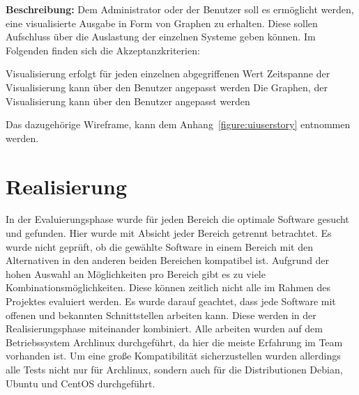 \textbf{Beschreibung:} Dem Administrator oder der Benutzer soll es ermöglicht
werden, eine visualisierte Ausgabe in Form von Graphen zu erhalten. Diese
sollen Aufschluss über die Auslastung der einzelnen Systeme geben können. Im
Folgenden finden sich die Akzeptanzkriterien:

\begin{outline}
  \1 Visualisierung erfolgt für jeden einzelnen abgegriffenen Wert
  \1 Zeitspanne der Visualisierung kann über den Benutzer angepasst werden
  \1 Die Graphen, der Visualisierung kann über den Benutzer angepasst werden
\end{outline}

Das dazugehörige Wireframe, kann dem Anhang~\ref{figure:uiuserstory}
entnommen werden.
\mr%

\chapter{Realisierung}
In der Evaluierungsphase wurde für jeden Bereich die optimale Software gesucht
und gefunden. Hier wurde mit Absicht jeder Bereich getrennt betrachtet. Es
wurde nicht geprüft, ob die gewählte Software in einem Bereich mit den
Alternativen in den anderen beiden Bereichen kompatibel ist. Aufgrund der hohen
Auswahl an Möglichkeiten pro Bereich gibt es zu viele
Kombinationsmöglichkeiten. Diese können zeitlich nicht alle im Rahmen des
Projektes evaluiert werden. Es wurde darauf geachtet, dass jede Software mit
offenen und bekannten Schnittstellen arbeiten kann. Diese werden in der
Realisierungsphase miteinander kombiniert. Alle arbeiten wurden auf dem
Betriebssystem Archlinux durchgeführt, da hier die meiste Erfahrung im Team
vorhanden ist. Um eine große Kompatibilität sicherzustellen wurden allerdings
alle Tests nicht nur für Archlinux, sondern auch für die Distributionen Debian,
Ubuntu und CentOS durchgeführt.
\all%

